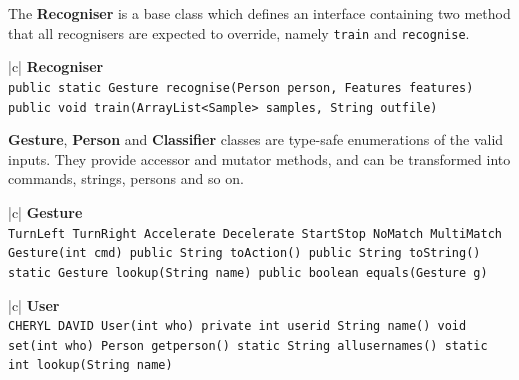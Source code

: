 \documentclass[12pt,a4,notitlepage]{report}
\renewcommand{\_}{\texttt{\symbol{95}}}
\newcommand{\<}{\texttt{\symbol{60}}}
\renewcommand{\>}{\texttt{\symbol{62}}}
\newcommand{\class}[1]{\textbf{#1}}
\newcommand{\variable}[1]{\texttt{#1}}
\begin{document}
The \class{Recogniser} is a base class which defines an interface containing two method that all recognisers are expected to override, namely \variable{train} and \variable{recognise}.

\begin{tabular}{|c|} \hline 
\class{Recogniser} \\ \hline
{}
{\variable{public static Gesture recognise(Person person, Features features) \newline
public void train(ArrayList<Sample> samples, String out\_file)
 } } \\
\hline
\end{tabular}

\class{Gesture}, \class{Person} and \class{Classifier} classes are type-safe enumerations of the valid inputs. They provide accessor and mutator methods, and can be transformed into commands, strings, persons and so on.

\begin{tabular}{|c|} \hline 
\class{Gesture} \\ \hline
{}
{\variable{TurnLeft \newline TurnRight \newline Accelerate \newline Decelerate \newline StartStop \newline NoMatch \newline MultiMatch \newline
Gesture(int cmd) \newline
public String toAction() \newline
public String toString() \newline
static Gesture lookup(String name) \newline
public boolean equals(Gesture g)
} } \\ \hline
\end{tabular}

\begin{tabular}{|c|} \hline 
\class{User} \\ \hline
{}
{\variable{CHERYL \newline DAVID \newline
User(int who) \newline
private int userid \newline
String name() \newline
void set(int who) \newline
Person get\_person() \newline
static String all\_usernames() \newline
static int lookup(String name)
} } \\ \hline
\end{tabular}
\end{document}
